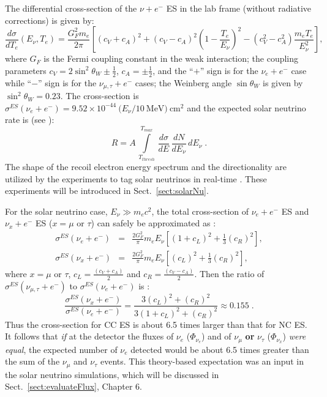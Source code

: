 The differential cross-section of the $\nu+e^-$ ES in the lab frame (without radiative corrections) is given by\cite{giunti2007fundamentals,xing2011neutrinos,suzuki2020sun}:
\begin{equation}
\frac{d\sigma}{dT_e}(E_\nu,T_e)=\frac{G_F^2m_e}{2\pi}\left[(c_V+c_A)^2+(c_V-c_A)^2\left(1-\frac{T_e}{E_\nu}\right)^2-(c_V^2-c_A^2)\frac{m_eT_e}{E_\nu^2}\right],
\end{equation}
where $G_F$ is the Fermi coupling constant in the weak interaction; the coupling parameters $c_V=2\sin^2\theta_W\pm\frac{1}{2}$, $c_A=\pm\frac{1}{2}$, and the ``$+$'' sign is for the $\nu_e+e^-$ case while ``$-$'' sign is for the $\nu_{\mu,\tau}+e^-$ cases; the Weinberg angle $\sin\theta_W$ is given by $\sin^2\theta_W=0.23$. The cross-section is $\sigma^{ES}(\nu_e +e^-)=9.52\times 10^{-44}~(E_\nu/10~\mathrm{MeV)~cm^2}$ and the expected solar neutrino rate is (see \cite{suzuki2020sun}):
\begin{equation}
R=A \, \int\limits_{T_{thresh}}^{T_{max}} \, \frac{d\sigma}{dE} \, \frac{dN}{dE_\nu} \, dE_\nu    \; .
\end{equation}
The shape of the recoil electron energy spectrum and the directionality are utilized by the experiments to tag solar neutrinos in real-time \cite{suzuki2020sun}. These experiments will be introduced in Sect.~\ref{sect:solarNu}.

For the solar neutrino case, $E_\nu\gg m_e c^2$, the total cross-section of $\nu_e+e^-$ ES and $\nu_x+e^-$ ES ($x=\mu$ or $\tau$) can safely be approximated as \cite{xing2011neutrinos}:
\begin{eqnarray}
\sigma^{ES}(\nu_e+e^-) &=& \frac{2G_F^2}{\pi}m_e E_\nu \left[(1+c_L)^2+\frac{1}{3}(c_R)^2\right],\\
\sigma^{ES}(\nu_x+e^-) &=& \frac{2G_F^2}{\pi}m_e E_\nu \left[(c_L)^2+\frac{1}{3}(c_R)^2\right],
\end{eqnarray}
where $x=\mu$ or $\tau$, $c_L=\frac{(c_V+c_A)}{2}$ and $c_R = \frac{(c_V-c_A)}{2}$. Then the ratio of $\sigma^{ES}(\nu_{\mu,\tau}+e^-)$ to $\sigma^{ES}(\nu_e+e^-)$ is \cite{xing2011neutrinos}:
\begin{equation}\label{eq:ratio1}
\frac{\sigma^{ES}(\nu_{x}+e^-)}{\sigma^{ES}(\nu_e+e^-)} = \frac{3(c_L)^2+({c_R})^2}{3(1+c_L)^2+(c_R)^2} \approx 0.155 \; .
\end{equation}
Thus the cross-section for CC ES is about 6.5 times larger than that for NC ES. It follows that {\em if} at the detector the fluxes of $\nu_e$ ($\Phi_{\nu_e}$) and of $\nu_{\mu}$ {\bf or} $\nu_\tau$ ($\Phi_{\nu_x}$) {\em were equal}, the expected number of $\nu_e$ detected would be about 6.5 times greater than the sum of the $\nu_{\mu}$ and $\nu_\tau$ events. This theory-based expectation was an input in the solar neutrino simulations, which will be discussed in Sect.~\ref{sect:evaluateFlux}, Chapter 6. 

